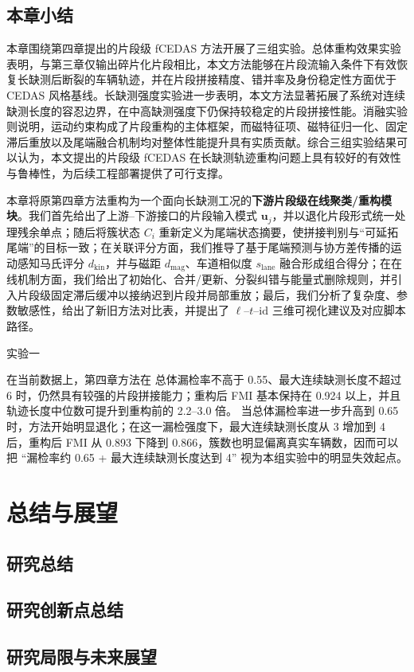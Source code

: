 \documentclass{xdupgthesis}
\begin{document}
\section*{本章小结}
本章围绕第四章提出的片段级 fCEDAS 方法开展了三组实验。总体重构效果实验表明，与第三章仅输出碎片化片段相比，本文方法能够在片段流输入条件下有效恢复长缺测后断裂的车辆轨迹，并在片段拼接精度、错并率及身份稳定性方面优于 CEDAS 风格基线。长缺测强度实验进一步表明，本文方法显著拓展了系统对连续缺测长度的容忍边界，在中高缺测强度下仍保持较稳定的片段拼接性能。消融实验则说明，运动约束构成了片段重构的主体框架，而磁特征项、磁特征归一化、固定滞后重放以及尾端融合机制均对整体性能提升具有实质贡献。综合三组实验结果可以认为，本文提出的片段级 fCEDAS 在长缺测轨迹重构问题上具有较好的有效性与鲁棒性，为后续工程部署提供了可行支撑。

本章将原第四章方法重构为一个面向长缺测工况的\textbf{下游片段级在线聚类/重构模块}。我们首先给出了上游--下游接口的片段输入模式 $\mathbf{u}_j$，并以退化片段形式统一处理残余单点；随后将簇状态 $C_i$ 重新定义为尾端状态摘要，使拼接判别与“可延拓尾端”的目标一致；在关联评分方面，我们推导了基于尾端预测与协方差传播的运动感知马氏评分 $d_{\mathrm{kin}}$，并与磁距 $d_{\mathrm{mag}}$、车道相似度 $s_{\mathrm{lane}}$ 融合形成组合得分；在在线机制方面，我们给出了初始化、合并/更新、分裂纠错与能量式删除规则，并引入片段级固定滞后缓冲以接纳迟到片段并局部重放；最后，我们分析了复杂度、参数敏感性，给出了新旧方法对比表，并提出了 $\ell$--$t$--$\mathrm{id}$ 三维可视化建议及对应脚本路径。


实验一

在当前数据上，第四章方法在 总体漏检率不高于 0.55、最大连续缺测长度不超过 6 时，仍然具有较强的片段拼接能力；重构后 FMI 基本保持在 0.924 以上，并且轨迹长度中位数可提升到重构前的 2.2–3.0 倍。
当总体漏检率进一步升高到 0.65 时，方法开始明显退化；在这一漏检强度下，最大连续缺测长度从 3 增加到 4 后，重构后 FMI 从 0.893 下降到 0.866，簇数也明显偏离真实车辆数，因而可以把 “漏检率约 0.65 + 最大连续缺测长度达到 4” 视为本组实验中的明显失效起点。





\chapter{总结与展望}

\section{研究总结}



\section{研究创新点总结}



\section{研究局限与未来展望}
\end{document}
